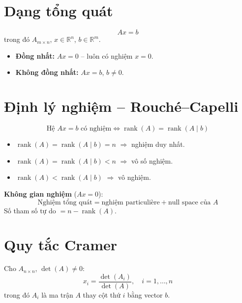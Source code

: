 
\section{Dạng tổng quát}

\[
Ax = b
\]
trong đó $A_{m \times n}$, $x \in \mathbb{R}^n$, $b \in \mathbb{R}^m$.

\begin{itemize}
    \item \textbf{Đồng nhất:} $Ax = 0$ -- luôn có nghiệm $x = 0$.
    \item \textbf{Không đồng nhất:} $Ax = b$, $b \neq 0$.
\end{itemize}

\section{Định lý nghiệm -- Rouché--Capelli}

\[
\text{Hệ } Ax = b \text{ có nghiệm} \iff \operatorname{rank}(A) = \operatorname{rank}(A \mid b)
\]

\begin{itemize}
    \item $\operatorname{rank}(A) = \operatorname{rank}(A \mid b) = n$ $\Longrightarrow$ nghiệm duy nhất.
    \item $\operatorname{rank}(A) = \operatorname{rank}(A \mid b) < n$ $\Longrightarrow$ vô số nghiệm.
    \item $\operatorname{rank}(A) < \operatorname{rank}(A \mid b)$ $\Longrightarrow$ vô nghiệm.
\end{itemize}

\textbf{Không gian nghiệm} ($Ax = 0$):
\[
\text{Nghiệm tổng quát} = \text{nghiệm particulière} + \text{null space của } A
\]
Số tham số tự do $= n - \operatorname{rank}(A)$.

\section{Quy tắc Cramer}

Cho $A_{n \times n}$, $\det(A) \neq 0$:
\[
x_i = \frac{\det(A_i)}{\det(A)}, \quad i = 1, \dots, n
\]
trong đó $A_i$ là ma trận $A$ thay cột thứ $i$ bằng vector $b$.

